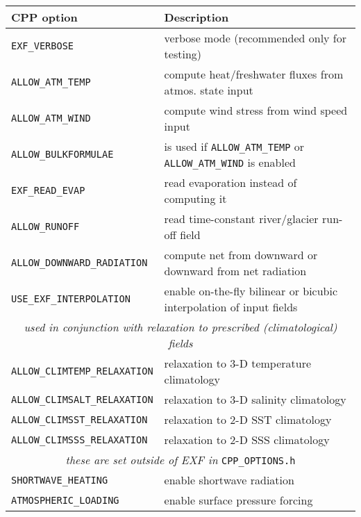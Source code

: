 \begin{table}[b!]
  \label{tab:pkg:exf:cpp}
  {\footnotesize
    \begin{tabular}{|l|l|}
      \hline 
      \textbf{CPP option}  &  \textbf{Description}  \\
      \hline \hline
        \texttt{EXF\_VERBOSE} & 
          verbose mode (recommended only for testing) \\
        \texttt{ALLOW\_ATM\_TEMP} & 
          compute heat/freshwater fluxes from atmos. state input \\
        \texttt{ALLOW\_ATM\_WIND} & 
          compute wind stress from wind speed input\\
        \texttt{ALLOW\_BULKFORMULAE} & 
          is used if \texttt{ALLOW\_ATM\_TEMP} or 
          \texttt{ALLOW\_ATM\_WIND} is enabled \\
        \texttt{EXF\_READ\_EVAP} & read evaporation instead of computing it \\
        \texttt{ALLOW\_RUNOFF} & read time-constant river/glacier run-off field \\
        \texttt{ALLOW\_DOWNWARD\_RADIATION} & compute net from downward or downward from net radiation \\
        \texttt{USE\_EXF\_INTERPOLATION} & enable on-the-fly bilinear or bicubic interpolation of input fields \\
      \hline
         \multicolumn{2}{|c|}{\textit{used in conjunction with relaxation to prescribed (climatological) fields}} \\
         \hline
        \texttt{ALLOW\_CLIMTEMP\_RELAXATION} & 
          relaxation to 3-D temperature climatology \\
        \texttt{ALLOW\_CLIMSALT\_RELAXATION} & 
          relaxation to 3-D salinity climatology \\
        \texttt{ALLOW\_CLIMSST\_RELAXATION} &
          relaxation to 2-D SST climatology \\
        \texttt{ALLOW\_CLIMSSS\_RELAXATION} &
          relaxation to 2-D SSS climatology  \\
      \hline
         \multicolumn{2}{|c|}{\textit{these are set outside of EXF in} \texttt{CPP\_OPTIONS.h}} \\
         \hline
        \texttt{SHORTWAVE\_HEATING} & enable shortwave radiation \\
        \texttt{ATMOSPHERIC\_LOADING} & enable surface pressure forcing \\
      \hline
    \end{tabular}
  }
  \caption{~}
\end{table}


